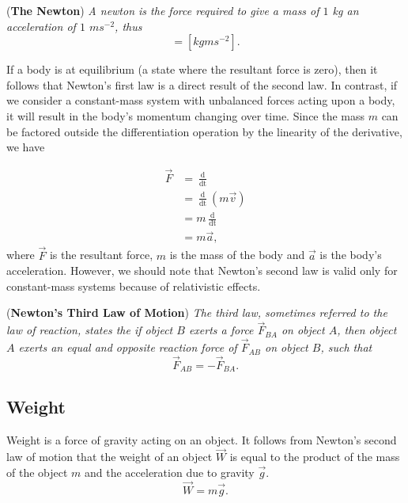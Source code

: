 \begin{definition}{(\textbf{The Newton})}
\textit{A newton is the force required to give a mass of $1$ kg an acceleration of $1$ $ms^{-2}$, thus}
\begin{equation*}
    [N] = [kgms^{-2}].
\end{equation*}
\end{definition}

If a body is at equilibrium (a state where the resultant force is zero), then it follows that Newton's first law is a direct result of the second law. In contrast, if we consider a constant-mass system with unbalanced forces acting upon a body, it will result in the body's momentum changing over time. Since the mass $m$ can be factored outside the differentiation operation by the linearity of the derivative, we have

\begin{align}
    \vec{F} &= \frac{\mathop{\mathrm{d}\vec{p}}}{\mathop{\mathrm{d}t}} \\
    &= \frac{\mathop{\mathrm{d}}}{\mathop{\mathrm{d}t}}(m \vec{v}) \\
    &= m \frac{\mathop{\mathrm{d}\vec{v}}}{\mathop{\mathrm{d}t}} \\
    &= m \vec{a},
\end{align}
where $\vec{F}$ is the resultant force, $m$ is the mass of the body and $\vec{a}$ is the body's acceleration. However, we should note that Newton's second law is valid only for constant-mass systems because of relativistic effects.

\begin{theorem}{(\textbf{Newton's Third Law of Motion})}
\textit{The third law, sometimes referred to the law of reaction, states the if object $B$ exerts a force $\vec{F}_{BA}$ on object $A$, then object $A$ exerts an equal and opposite reaction force of $\vec{F}_{AB}$ on object $B$, such that}
\begin{equation}
    \vec{F}_{AB} = -\vec{F}_{BA}.
\end{equation}
\end{theorem}

\subsection{Weight}

Weight is a force of gravity acting on an object. It follows from Newton's second law of motion that the weight of an object $\vec{W}$ is equal to the product of the mass of the object $m$ and the acceleration due to gravity $\vec{g}$. 
\begin{equation}
    \vec{W} = m\vec{g}.
\end{equation}

